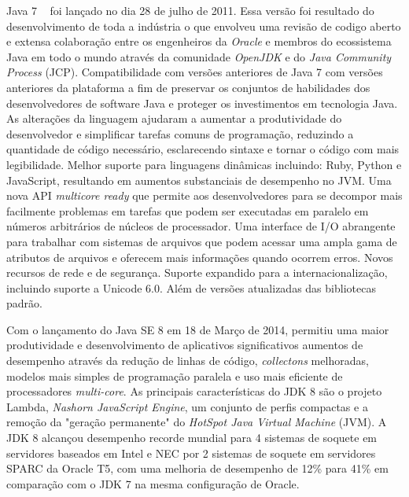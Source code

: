 Java 7 ~\cite{JSE7} foi lançado no dia 28 de julho de 2011. Essa versão foi resultado do desenvolvimento de toda a indústria o que envolveu uma revisão de codigo aberto e extensa colaboração entre os engenheiros da {\it Oracle} e membros do ecossistema Java em todo o mundo através da comunidade {\it OpenJDK} e do {\it Java Community Process} (\acs{JCP}). Compatibilidade com versões anteriores de Java 7 com versões anteriores da plataforma a fim de preservar os conjuntos de habilidades dos desenvolvedores de software Java e proteger os investimentos em tecnologia Java. As alterações da linguagem ajudaram a aumentar a produtividade do desenvolvedor e simplificar tarefas comuns de programação, reduzindo a quantidade de código necessário, esclarecendo sintaxe e tornar o código com mais legibilidade. Melhor suporte para linguagens dinâmicas incluindo: Ruby, Python e JavaScript, resultando em aumentos substanciais de desempenho no \acs{JVM}. Uma nova API {\it multicore ready} que permite aos desenvolvedores para se decompor mais facilmente problemas em tarefas que podem ser executadas em paralelo em números arbitrários de núcleos de processador. Uma interface de I/O abrangente para trabalhar com sistemas de arquivos que podem acessar uma ampla gama de atributos de arquivos e oferecem mais informações quando ocorrem erros. Novos recursos de rede e de segurança. Suporte expandido para a internacionalização, incluindo suporte a Unicode 6.0. Além de versões atualizadas das bibliotecas padrão.

Com o lançamento do Java SE 8 em 18 de Março de 2014, permitiu uma maior produtividade e desenvolvimento de aplicativos significativos aumentos de desempenho através da redução de linhas de código, {\it collectons} melhoradas, modelos mais simples de programação paralela e uso mais eficiente de processadores {\it multi-core}. As principais características do \acs{JDK} 8 são o projeto Lambda, {\it Nashorn JavaScript Engine}, um conjunto de perfis compactas e a remoção da "geração permanente" do {\it HotSpot Java Virtual Machine} (\acs{JVM}). A \acs{JDK} 8 alcançou desempenho recorde mundial para 4 sistemas de soquete em servidores baseados em Intel e NEC por 2 sistemas de soquete em servidores SPARC da Oracle T5, com uma melhoria de desempenho de 12\% para 41\% em comparação com o JDK 7 na mesma configuração de Oracle.

